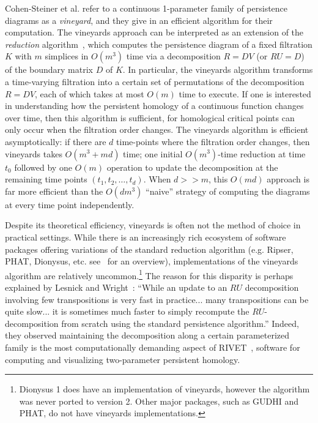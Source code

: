 \documentclass[sn-mathphys]{sn-jnl}
\begin{document}
Cohen-Steiner et al. refer to a continuous 1-parameter family of persistence diagrams as a \emph{vineyard}, and they give in \cite{cohen2006vines} an efficient algorithm for their computation. 
The vineyards approach can be interpreted as an extension of the \emph{reduction} algorithm~\cite{zomorodian2005computing}, which computes the persistence diagram of a fixed filtration $K$ with $m$ simplices in $O(m^3)$ time via a decomposition $R = D V$ (or $RU = D$) of the boundary matrix $D$ of $K$.
In particular, the vineyards algorithm transforms a time-varying filtration into a certain set of permutations of the decomposition $R = DV$, each of which takes at most $O(m)$ time to execute. If one is interested in understanding how the persistent homology of a continuous function changes over time, then this algorithm is sufficient, for homological critical points can only occur when the filtration order changes. 
The vineyards algorithm is efficient asymptotically: if there are $d$ time-points where the filtration order changes, then  vineyards   takes $O(m^3 + md)$ time; one initial $O(m^3)$-time reduction at time $t_0$ followed by one $O(m)$ operation to update the decomposition at the remaining time points $(t_1, t_2, \dots, t_d)$. When $d >> m$, this $O(md)$ approach is far more efficient than the $O(dm^3)$  ``naive'' strategy of computing the diagrams at every time point independently.

Despite its theoretical efficiency, vineyards is often not the method of choice in practical settings. 
While there is an increasingly rich ecosystem of software packages offering variations of the standard reduction algorithm (e.g. Ripser, PHAT, Dionysus, etc. see~\cite{otter2017roadmap} for an overview), implementations of the vineyards algorithm are relatively uncommon.\footnote{Dionysus 1 does have an implementation of vineyards, however the algorithm was never ported to version 2. Other major packages, such as GUDHI and PHAT, do not have vineyards implementations.} 
The reason for this disparity is perhaps explained by Lesnick and Wright~\cite{lesnick2015interactive}: ``While an update to an $RU$ decomposition involving few transpositions is very fast in practice... many transpositions can be quite slow... it is sometimes much faster to simply recompute the $RU$-decomposition from scratch using the standard persistence algorithm.'' Indeed, they observed maintaining the decomposition along a certain parameterized family is the most computationally demanding aspect of RIVET~\cite{rivet}, software for computing and visualizing	 two-parameter persistent homology.
\end{document}
